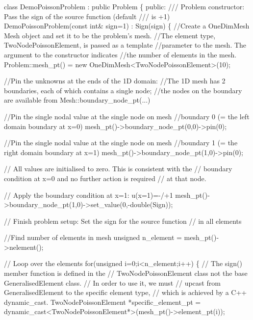  
\begin{DoxyCodeInclude}
\textcolor{keyword}{class }DemoPoissonProblem : \textcolor{keyword}{public} Problem 
 \{
  \textcolor{keyword}{public}:
\textcolor{comment}{}
\textcolor{comment}{  /// Problem constructor: Pass the sign of the source function (default}
\textcolor{comment}{  /// is +1)}
\textcolor{comment}{}  DemoPoissonProblem(\textcolor{keyword}{const} \textcolor{keywordtype}{int}& sign=1) : Sign(sign)
   \{
    \textcolor{comment}{//Create a OneDimMesh Mesh object and set it to be the problem's mesh.}
    \textcolor{comment}{//The element type, TwoNodePoissonElement, is passed  as a template }
    \textcolor{comment}{//parameter to the mesh. The argument to the constructor indicates}
    \textcolor{comment}{//the number of elements in the mesh.}
    Problem::mesh\_pt() = \textcolor{keyword}{new} OneDimMesh<TwoNodePoissonElement>(10);

    \textcolor{comment}{//Pin the unknowns at the ends of the 1D domain:}
    \textcolor{comment}{//The 1D mesh has 2 boundaries, each of which contains a single node;}
    \textcolor{comment}{//the nodes on the boundary are available from Mesh::boundary\_node\_pt(...)}

    \textcolor{comment}{//Pin the single nodal value at the single node on mesh }
    \textcolor{comment}{//boundary 0 (= the left domain boundary at x=0)}
    mesh\_pt()->boundary\_node\_pt(0,0)->pin(0);

    \textcolor{comment}{//Pin the single nodal value at the single node on mesh }
    \textcolor{comment}{//boundary 1 (= the right domain boundary at x=1)}
    mesh\_pt()->boundary\_node\_pt(1,0)->pin(0);

    \textcolor{comment}{// All values are initialised to zero. This is consistent with the}
    \textcolor{comment}{// boundary condition at x=0 and no further action is required}
    \textcolor{comment}{// at that node.}

    \textcolor{comment}{// Apply the boundary condition at x=1: u(x=1)=-/+1}
    mesh\_pt()->boundary\_node\_pt(1,0)->set\_value(0,-\textcolor{keywordtype}{double}(Sign));

    
    \textcolor{comment}{// Finish problem setup: Set the sign for the source function}
    \textcolor{comment}{// in all elements}
    
    \textcolor{comment}{//Find number of elements in mesh}
    \textcolor{keywordtype}{unsigned} n\_element = mesh\_pt()->nelement();
    
    \textcolor{comment}{// Loop over the elements }
    \textcolor{keywordflow}{for}(\textcolor{keywordtype}{unsigned} i=0;i<n\_element;i++)
     \{
      \textcolor{comment}{// The sign() member function is defined in the }
      \textcolor{comment}{// TwoNodePoissonElement class not the base GeneralisedElement class.}
      \textcolor{comment}{// In order to use it, we must}
      \textcolor{comment}{// upcast from GeneralisedElement to the specific element type,}
      \textcolor{comment}{// which is achieved by a C++ dynamic\_cast.}
      TwoNodePoissonElement *specific\_element\_pt 
       = \textcolor{keyword}{dynamic\_cast<}TwoNodePoissonElement*\textcolor{keyword}{>}(mesh\_pt()->element\_pt(i));
      

\end{DoxyCodeInclude}
